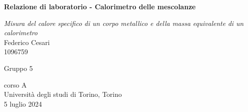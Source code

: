 \begin{titlepage}
	\begin{center}
		\vspace*{1cm}
		
		\textbf{\LARGE Relazione di laboratorio - Calorimetro delle mescolanze}
		
		\vspace{0.3cm}
		\large \textit{Misura del calore specifico di un corpo metallico e della massa equivalente di un calorimetro} \\
		
		\vspace{0.5cm}
		\Large Federico Cesari \\
		
		\small 1096759 
		\vspace{0.2cm}
		
		\small Gruppo 5
		
		
		
		
		
		\vfill
		
		
		
		corso A\\
		Università degli studi di Torino, Torino\\
		5 luglio 2024\\
		
		
	\end{center}
\end{titlepage}